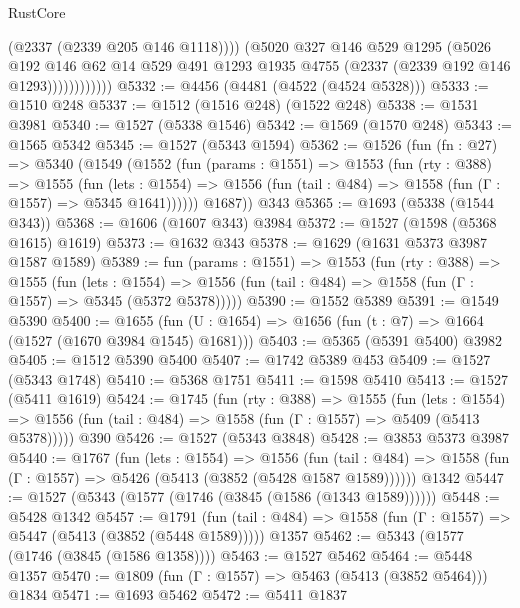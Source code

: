 \begin{lexlean}{RustCore}
\begin{coremodule}
                        (@2337 (@2339 @205 @146 @1118))))
                    (@5020
                      @327
                      @146
                      @529
                      @1295
                      (@5026
                        @192
                        @146
                        @62
                        @14
                        @529
                        @491
                        @1293
                        @1935
                        @4755
                        (@2337 (@2339 @192 @146 @1293))))))))))))
@5332 := @4456 (@4481 (@4522 (@4524 @5328)))
@5333 := @1510 @248
@5337 := @1512 (@1516 @248) (@1522 @248)
@5338 := @1531 @3981
@5340 := @1527 (@5338 @1546)
@5342 := @1569 (@1570 @248)
@5343 := @1565 @5342
@5345 := @1527 (@5343 @1594)
@5362 := @1526
    (fun (fn : @27) =>
    @5340
      (@1549
        (@1552
          (fun (params : @1551) =>
          @1553
            (fun (rty : @388) =>
            @1555
              (fun (lets : @1554) =>
              @1556 (fun (tail : @484) => @1558 (fun (Γ : @1557) => @5345 @1641))))))
        @1687))
    @343
@5365 := @1693 (@5338 (@1544 @343))
@5368 := @1606 (@1607 @343) @3984
@5372 := @1527 (@1598 (@5368 @1615) @1619)
@5373 := @1632 @343
@5378 := @1629 (@1631 @5373 @3987 @1587 @1589)
@5389 := fun (params : @1551) =>
  @1553
    (fun (rty : @388) =>
    @1555
      (fun (lets : @1554) =>
      @1556 (fun (tail : @484) => @1558 (fun (Γ : @1557) => @5345 (@5372 @5378)))))
@5390 := @1552 @5389
@5391 := @1549 @5390
@5400 := @1655 (fun (U : @1654) => @1656 (fun (t : @7) => @1664 (@1527 (@1670 @3984 @1545) @1681)))
@5403 := @5365 (@5391 @5400) @3982
@5405 := @1512 @5390 @5400
@5407 := @1742 @5389 @453
@5409 := @1527 (@5343 @1748)
@5410 := @5368 @1751
@5411 := @1598 @5410
@5413 := @1527 (@5411 @1619)
@5424 := @1745
    (fun (rty : @388) =>
    @1555
      (fun (lets : @1554) =>
      @1556 (fun (tail : @484) => @1558 (fun (Γ : @1557) => @5409 (@5413 @5378)))))
    @390
@5426 := @1527 (@5343 @3848)
@5428 := @3853 @5373 @3987
@5440 := @1767
    (fun (lets : @1554) =>
    @1556
      (fun (tail : @484) => @1558 (fun (Γ : @1557) => @5426 (@5413 (@3852 (@5428 @1587 @1589))))))
    @1342
@5447 := @1527 (@5343 (@1577 (@1746 (@3845 (@1586 (@1343 @1589))))))
@5448 := @5428 @1342
@5457 := @1791
    (fun (tail : @484) => @1558 (fun (Γ : @1557) => @5447 (@5413 (@3852 (@5448 @1589)))))
    @1357
@5462 := @5343 (@1577 (@1746 (@3845 (@1586 @1358))))
@5463 := @1527 @5462
@5464 := @5448 @1357
@5470 := @1809 (fun (Γ : @1557) => @5463 (@5413 (@3852 @5464))) @1834
@5471 := @1693 @5462
@5472 := @5411 @1837

\end{coremodule}
\end{lexlean}

